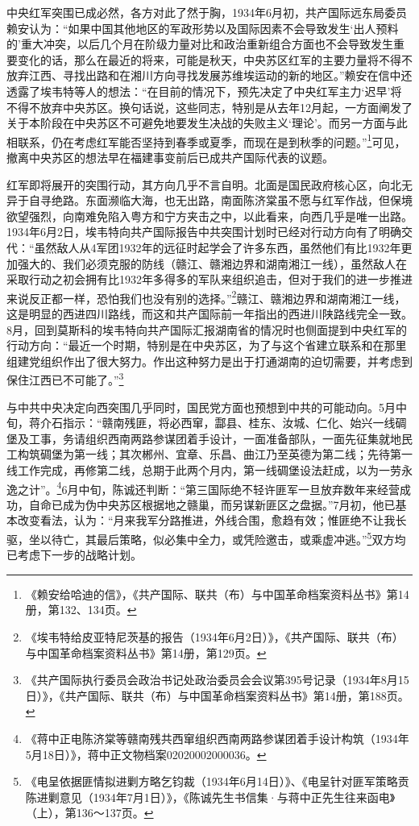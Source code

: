 中央红军突围已成必然，各方对此了然于胸，1934年6月初，共产国际远东局委员赖安认为：“如果中国其他地区的军政形势以及国际因素不会导致发生‘出人预料的’重大冲突，以后几个月在阶级力量对比和政治重新组合方面也不会导致发生重要变化的话，那么在最近的将来，可能是秋天，中央苏区红军的主要力量将不得不放弃江西、寻找出路和在湘川方向寻找发展苏维埃运动的新的地区。”赖安在信中还透露了埃韦特等人的想法：“在目前的情况下，预先决定了中央红军主力‘迟早’将不得不放弃中央苏区。换句话说，这些同志，特别是从去年12月起，一方面阐发了关于本阶段在中央苏区不可避免地要发生决战的失败主义‘理论’。而另一方面与此相联系，仍在考虑红军能否坚持到春季或夏季，而现在是到秋季的问题。”\footnote{《赖安给哈迪的信》，《共产国际、联共（布）与中国革命档案资料丛书》第14册，第132、134页。}可见，撤离中央苏区的想法早在福建事变前后已成共产国际代表的议题。


红军即将展开的突围行动，其方向几乎不言自明。北面是国民政府核心区，向北无异于自寻绝路。东面濒临大海，也无出路，南面陈济棠虽不愿与红军作战，但保境欲望强烈，向南难免陷入粤方和宁方夹击之中，以此看来，向西几乎是唯一出路。1934年6月2日，埃韦特向共产国际报告中共突围计划时已经对行动方向有了明确交代：“虽然敌人从4军团1932年的远征时起学会了许多东西，虽然他们有比1932年更加强大的、我们必须克服的防线（赣江、赣湘边界和湖南湘江一线），虽然敌人在采取行动之初会拥有比1932年多得多的军队来组织追击，但对于我们的进一步推进来说反正都一样，恐怕我们也没有别的选择。”\footnote{《埃韦特给皮亚特尼茨基的报告（1934年6月2日）》，《共产国际、联共（布）与中国革命档案资料丛书》第14册，第129页。}赣江、赣湘边界和湖南湘江一线，这是明显的西进四川路线，而这和共产国际前一年指出的西进川陕路线完全一致。8月，回到莫斯科的埃韦特向共产国际汇报湖南省的情况时也侧面提到中央红军的行动方向：“最近一个时期，特别是在中央苏区，为了与这个省建立联系和在那里组建党组织作出了很大努力。作出这种努力是出于打通湖南的迫切需要，并考虑到保住江西已不可能了。”\footnote{《共产国际执行委员会政治书记处政治委员会会议第395号记录（1934年8月15日）》，《共产国际、联共（布）与中国革命档案资料丛书》第14册，第188页。}


与中共中央决定向西突围几乎同时，国民党方面也预想到中共的可能动向。5月中旬，蒋介石指示：“赣南残匪，将必西窜，酃县、桂东、汝城、仁化、始兴一线碉堡及工事，务请组织西南两路参谋团着手设计，一面准备部队，一面先征集就地民工构筑碉堡为第一线；其次郴州、宜章、乐昌、曲江乃至英德为第二线；先待第一线工作完成，再修第二线，总期于此两个月内，第一线碉堡设法赶成，以为一劳永逸之计”。\footnote{《蒋中正电陈济棠等赣南残共西窜组织西南两路参谋团着手设计构筑（1934年5月18日）》，蒋中正文物档案02020002000036。}6月中旬，陈诚还判断：“第三国际绝不轻许匪军一旦放弃数年来经营成功，自命已成为伪中央苏区根据地之赣巢，而另谋新匪区之盘据。”7月初，他已基本改变看法，认为：“月来我军分路推进，外线合围，愈趋有效；惟匪绝不让我长驱，坐以待亡，其最后策略，似必集中全力，或凭险邀击，或乘虚冲逃。”\footnote{《电呈依据匪情拟进剿方略乞钧裁（1934年6月14日）》、《电呈针对匪军策略贡陈进剿意见（1934年7月1日）》，《陈诚先生书信集·与蒋中正先生往来函电》（上），第136～137页。}双方均已考虑下一步的战略计划。

